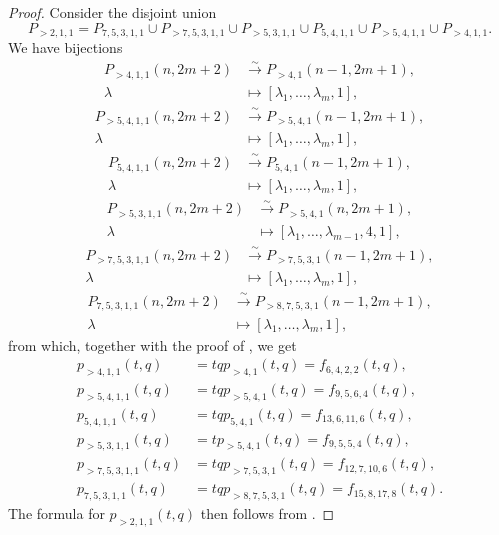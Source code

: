 \documentclass[a4paper, 12pt, reqno]{amsart}
\theoremstyle{remark}
\numberwithin{equation}{subsection}
\begin{document}
\begin{proof}
  Consider the disjoint union
  \begin{equation*}
    P_{>2, 1, 1} = P_{7, 5, 3, 1, 1} \cup P_{>7, 5, 3, 1, 1} \cup P_{>5, 3, 1, 1} \cup P_{5, 4, 1, 1} \cup P_{>5, 4, 1, 1} \cup P_{>4, 1, 1}.
  \end{equation*}
  We have bijections
  \begin{align*}
    P_{>4, 1, 1}(n, 2m + 2) &\xrightarrow{\sim} P_{>4, 1}(n - 1, 2m + 1), \\
    \lambda &\mapsto [\lambda_1, \dots, \lambda_m, 1],
  \end{align*}
  \begin{align*}
    P_{>5, 4, 1, 1}(n, 2m + 2) &\xrightarrow{\sim} P_{>5, 4, 1}(n - 1, 2m + 1), \\
    \lambda &\mapsto [\lambda_1, \dots, \lambda_m, 1],
  \end{align*}
  \begin{align*}
    P_{5, 4, 1, 1}(n, 2m + 2) &\xrightarrow{\sim} P_{5, 4, 1}(n - 1, 2m + 1), \\
    \lambda &\mapsto [\lambda_1, \dots, \lambda_m, 1],
  \end{align*}
  \begin{align*}
    P_{>5, 3, 1, 1}(n, 2m + 2) &\xrightarrow{\sim} P_{>5, 4, 1}(n, 2m + 1), \\
    \lambda &\mapsto [\lambda_1, \dots, \lambda_{m - 1}, 4, 1],
  \end{align*}
  \begin{align*}
    P_{>7, 5, 3, 1, 1}(n, 2m + 2) &\xrightarrow{\sim} P_{>7, 5, 3, 1}(n - 1, 2m + 1), \\
    \lambda &\mapsto [\lambda_1, \dots, \lambda_m, 1],
  \end{align*}
  \begin{align*}
    P_{7, 5, 3, 1, 1}(n, 2m + 2) &\xrightarrow{\sim} P_{>8, 7, 5, 3, 1}(n - 1, 2m + 1), \\
    \lambda &\mapsto [\lambda_1, \dots, \lambda_m, 1],
  \end{align*}
  from which, together with the proof of , we get
  \begin{align*}
    p_{>4, 1, 1}(t, q) &= tqp_{>4, 1}(t, q) = f_{6, 4, 2, 2}(t, q), \\
    p_{>5, 4, 1, 1}(t, q) &= tqp_{>5, 4, 1}(t, q) = f_{9, 5, 6, 4}(t, q), \\
    p_{5, 4, 1, 1}(t, q) &= tqp_{5, 4, 1}(t, q) = f_{13, 6, 11, 6}(t, q), \\
    p_{>5, 3, 1, 1}(t, q) &= tp_{>5, 4, 1}(t, q) = f_{9, 5, 5, 4}(t, q), \\
    p_{>7, 5, 3, 1, 1}(t, q) &= tqp_{>7, 5, 3, 1}(t, q) = f_{12, 7, 10, 6}(t, q), \\
    p_{7, 5, 3, 1, 1}(t, q) &= tqp_{>8, 7, 5, 3, 1}(t, q) = f_{15, 8, 17, 8}(t, q).
  \end{align*}
  The formula for $p_{>2, 1, 1}(t, q)$ then follows from .
\end{proof}
\end{document}
